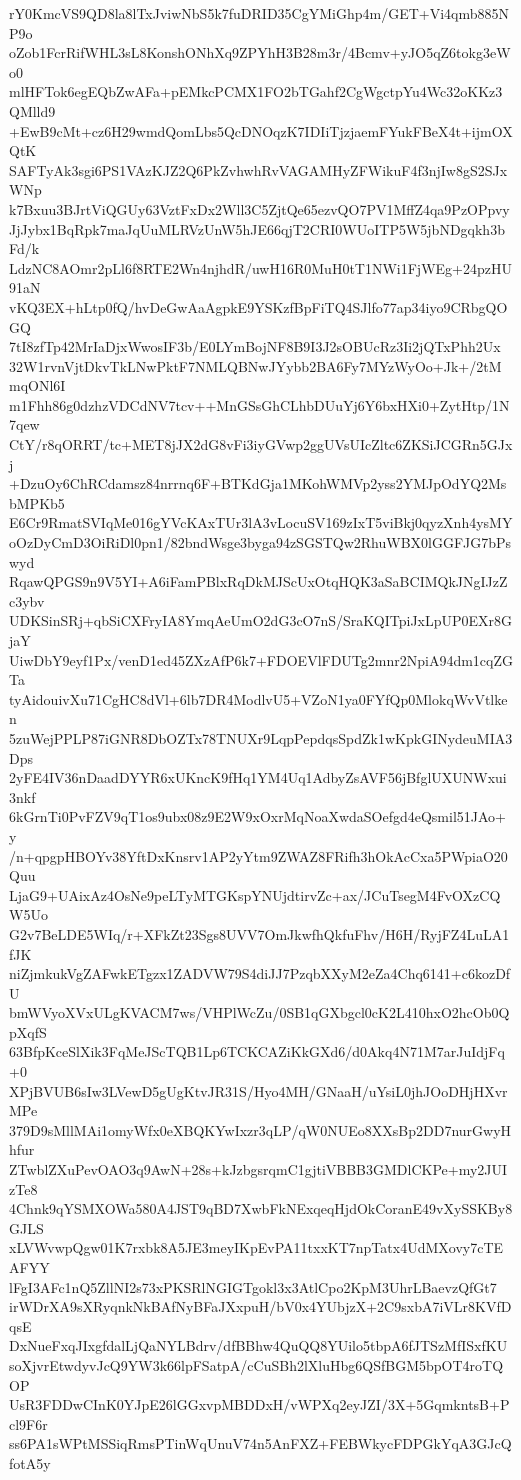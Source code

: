 rY0KmcVS9QD8la8lTxJviwNbS5k7fuDRID35CgYMiGhp4m/GET+Vi4qmb885NP9o
oZob1FcrRifWHL3sL8KonshONhXq9ZPYhH3B28m3r/4Bcmv+yJO5qZ6tokg3eWo0
mlHFTok6egEQbZwAFa+pEMkcPCMX1FO2bTGahf2CgWgctpYu4Wc32oKKz3QMlld9
+EwB9cMt+cz6H29wmdQomLbs5QcDNOqzK7IDIiTjzjaemFYukFBeX4t+ijmOXQtK
SAFTyAk3sgi6PS1VAzKJZ2Q6PkZvhwhRvVAGAMHyZFWikuF4f3njIw8gS2SJxWNp
k7Bxuu3BJrtViQGUy63VztFxDx2Wll3C5ZjtQe65ezvQO7PV1MffZ4qa9PzOPpvy
JjJybx1BqRpk7maJqUuMLRVzUnW5hJE66qjT2CRI0WUoITP5W5jbNDgqkh3bFd/k
LdzNC8AOmr2pLl6f8RTE2Wn4njhdR/uwH16R0MuH0tT1NWi1FjWEg+24pzHU91aN
vKQ3EX+hLtp0fQ/hvDeGwAaAgpkE9YSKzfBpFiTQ4SJlfo77ap34iyo9CRbgQOGQ
7tI8zfTp42MrIaDjxWwosIF3b/E0LYmBojNF8B9I3J2sOBUcRz3Ii2jQTxPhh2Ux
32W1rvnVjtDkvTkLNwPktF7NMLQBNwJYybb2BA6Fy7MYzWyOo+Jk+/2tMmqONl6I
m1Fhh86g0dzhzVDCdNV7tcv++MnGSsGhCLhbDUuYj6Y6bxHXi0+ZytHtp/1N7qew
CtY/r8qORRT/tc+MET8jJX2dG8vFi3iyGVwp2ggUVsUIcZltc6ZKSiJCGRn5GJxj
+DzuOy6ChRCdamsz84nrrnq6F+BTKdGja1MKohWMVp2yss2YMJpOdYQ2MsbMPKb5
E6Cr9RmatSVIqMe016gYVcKAxTUr3lA3vLocuSV169zIxT5viBkj0qyzXnh4ysMY
oOzDyCmD3OiRiDl0pn1/82bndWsge3byga94zSGSTQw2RhuWBX0lGGFJG7bPswyd
RqawQPGS9n9V5YI+A6iFamPBlxRqDkMJScUxOtqHQK3aSaBCIMQkJNgIJzZc3ybv
UDKSinSRj+qbSiCXFryIA8YmqAeUmO2dG3cO7nS/SraKQITpiJxLpUP0EXr8GjaY
UiwDbY9eyf1Px/venD1ed45ZXzAfP6k7+FDOEVlFDUTg2mnr2NpiA94dm1cqZGTa
tyAidouivXu71CgHC8dVl+6lb7DR4ModlvU5+VZoN1ya0FYfQp0MlokqWvVtlken
5zuWejPPLP87iGNR8DbOZTx78TNUXr9LqpPepdqsSpdZk1wKpkGINydeuMIA3Dps
2yFE4IV36nDaadDYYR6xUKncK9fHq1YM4Uq1AdbyZsAVF56jBfglUXUNWxui3nkf
6kGrnTi0PvFZV9qT1os9ubx08z9E2W9xOxrMqNoaXwdaSOefgd4eQsmil51JAo+y
/n+qpgpHBOYv38YftDxKnsrv1AP2yYtm9ZWAZ8FRifh3hOkAcCxa5PWpiaO20Quu
LjaG9+UAixAz4OsNe9peLTyMTGKspYNUjdtirvZc+ax/JCuTsegM4FvOXzCQW5Uo
G2v7BeLDE5WIq/r+XFkZt23Sgs8UVV7OmJkwfhQkfuFhv/H6H/RyjFZ4LuLA1fJK
niZjmkukVgZAFwkETgzx1ZADVW79S4diJJ7PzqbXXyM2eZa4Chq6141+c6kozDfU
bmWVyoXVxULgKVACM7ws/VHPlWcZu/0SB1qGXbgcl0cK2L410hxO2hcOb0QpXqfS
63BfpKceSlXik3FqMeJScTQB1Lp6TCKCAZiKkGXd6/d0Akq4N71M7arJuIdjFq+0
XPjBVUB6sIw3LVewD5gUgKtvJR31S/Hyo4MH/GNaaH/uYsiL0jhJOoDHjHXvrMPe
379D9sMllMAi1omyWfx0eXBQKYwIxzr3qLP/qW0NUEo8XXsBp2DD7nurGwyHhfur
ZTwblZXuPevOAO3q9AwN+28s+kJzbgsrqmC1gjtiVBBB3GMDlCKPe+my2JUIzTe8
4Chnk9qYSMXOWa580A4JST9qBD7XwbFkNExqeqHjdOkCoranE49vXySSKBy8GJLS
xLVWvwpQgw01K7rxbk8A5JE3meyIKpEvPA11txxKT7npTatx4UdMXovy7cTEAFYY
lFgI3AFc1nQ5ZllNI2s73xPKSRlNGIGTgokl3x3AtlCpo2KpM3UhrLBaevzQfGt7
irWDrXA9sXRyqnkNkBAfNyBFaJXxpuH/bV0x4YUbjzX+2C9sxbA7iVLr8KVfDqsE
DxNueFxqJIxgfdalLjQaNYLBdrv/dfBBhw4QuQQ8YUilo5tbpA6fJTSzMfISxfKU
soXjvrEtwdyvJcQ9YW3k66lpFSatpA/cCuSBh2lXluHbg6QSfBGM5bpOT4roTQOP
UsR3FDDwCInK0YJpE26lGGxvpMBDDxH/vWPXq2eyJZI/3X+5GqmkntsB+Pcl9F6r
ss6PA1sWPtMSSiqRmsPTinWqUnuV74n5AnFXZ+FEBWkycFDPGkYqA3GJcQfotA5y
